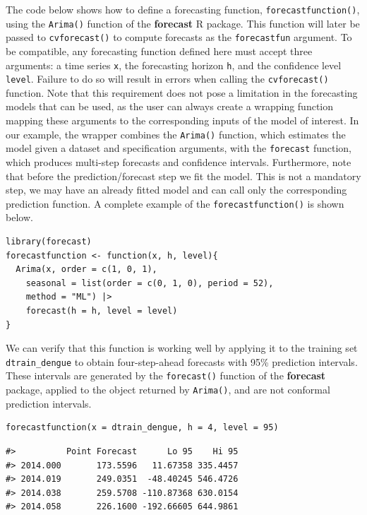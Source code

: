 The code below shows how to define a forecasting function,
\texttt{forecastfunction()}, using the \texttt{Arima()} function of the \textbf{forecast} R
package. This function will later be passed to \texttt{cvforecast()} to compute
forecasts as the \texttt{forecastfun} argument. To be compatible, any
forecasting function defined here must accept three arguments: a time
series \texttt{x}, the forecasting horizon \texttt{h}, and the confidence level
\texttt{level}. Failure to do so will result in errors when calling the
\texttt{cvforecast()} function. Note that this requirement does not pose a
limitation in the forecasting models that can be used, as the user can
always create a wrapping function mapping these arguments to the
corresponding inputs of the model of interest. In our example, the
wrapper combines the \texttt{Arima()} function, which estimates the model given
a dataset and specification arguments, with the \texttt{forecast} function,
which produces multi-step forecasts and confidence intervals.
Furthermore, note that before the prediction/forecast step we fit the
model. This is not a mandatory step, we may have an already fitted model
and can call only the corresponding prediction function. A complete
example of the \texttt{forecastfunction()} is shown below.

\begin{verbatim}
library(forecast)
forecastfunction <- function(x, h, level){
  Arima(x, order = c(1, 0, 1), 
    seasonal = list(order = c(0, 1, 0), period = 52),
    method = "ML") |>
    forecast(h = h, level = level)
}
\end{verbatim}

We can verify that this function is working well by applying it to the
training set \texttt{dtrain\_dengue} to obtain four-step-ahead forecasts with
95\% prediction intervals. These intervals are generated by the
\texttt{forecast()} function of the \textbf{forecast} package, applied to the object
returned by \texttt{Arima()}, and are not conformal prediction intervals.

\begin{verbatim}
forecastfunction(x = dtrain_dengue, h = 4, level = 95)
\end{verbatim}

\begin{verbatim}
#>          Point Forecast      Lo 95    Hi 95
#> 2014.000       173.5596   11.67358 335.4457
#> 2014.019       249.0351  -48.40245 546.4726
#> 2014.038       259.5708 -110.87368 630.0154
#> 2014.058       226.1600 -192.66605 644.9861
\end{verbatim}


